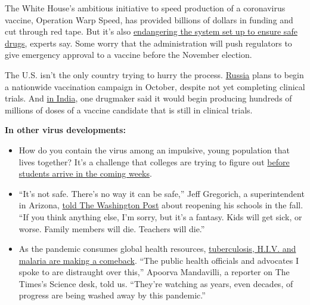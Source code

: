 The White House's ambitious initiative to speed production of a
coronavirus vaccine, Operation Warp Speed, has provided billions of
dollars in funding and cut through red tape. But it's also
\href{https://www.nytimes3xbfgragh.onion/2020/08/02/us/politics/coronavirus-vaccine.html}{endangering
the system set up to ensure safe drugs}, experts say. Some worry that
the administration will push regulators to give emergency approval to a
vaccine before the November election.

The U.S. isn't the only country trying to hurry the process.
\href{https://www.nytimes3xbfgragh.onion/2020/08/02/world/europe/russia-trials-vaccine-October.html}{Russia}
plans to begin a nationwide vaccination campaign in October, despite not
yet completing clinical trials. And
\href{https://www.nytimes3xbfgragh.onion/2020/08/01/world/asia/coronavirus-vaccine-india.html}{in
India}, one drugmaker said it would begin producing hundreds of millions
of doses of a vaccine candidate that is still in clinical trials.

\textbf{In other virus developments:}

\begin{itemize}
\item
  How do you contain the virus among an impulsive, young population that
  lives together? It's a challenge that colleges are trying to figure
  out
  \href{https://www.nytimes3xbfgragh.onion/2020/08/02/us/covid-college-reopening.html}{before
  students arrive in the coming weeks}.
\item
  ``It's not safe. There's no way it can be safe,'' Jeff Gregorich, a
  superintendent in Arizona,
  \href{https://www.washingtonpost.com/nation/2020/08/01/schools-reopening-coronavirus-arizona-superintendent/?arc404=true}{told
  The Washington Post} about reopening his schools in the fall. ``If you
  think anything else, I'm sorry, but it's a fantasy. Kids will get
  sick, or worse. Family members will die. Teachers will die.''
\item
  As the pandemic consumes global health resources,
  \href{https://www.nytimes3xbfgragh.onion/2020/08/03/health/coronavirus-tuberculosis-aids-malaria.html}{tuberculosis,
  H.I.V. and malaria are making a comeback}. ``The public health
  officials and advocates I spoke to are distraught over this,'' Apoorva
  Mandavilli, a reporter on The Times's Science desk, told us. ``They're
  watching as years, even decades, of progress are being washed away by
  this pandemic.''
\end{itemize}

